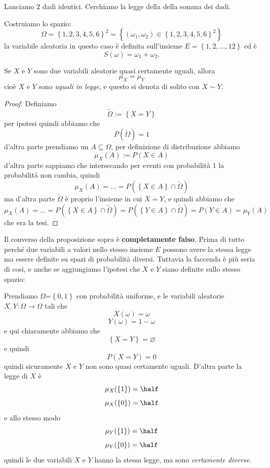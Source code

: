 \documentclass[11pt]{scrartcl}
\newcommand{\eset}{\varnothing}
\begin{document}
	\begin{problem}
		Lanciamo $2$ dadi identici. Cerchiamo la legge della della somma dei dadi.
	\end{problem}
	\begin{answer}
		Costruiamo lo spazio: 
		$$\Omega=\left\{1,2,3,4,5,6\right\}^2=\left\{(\omega_1,\omega_2)\in \left\{1,2,3,4,5,6\right\}^2\right\}$$
		la variabile aleatoria in questo caso è definita sull'insieme $E=\left\{1,2,\dots,12\right\}$ ed è
		$$S(\omega)=\omega_1+\omega_2.$$
	\end{answer}
	\begin{proposition}
		Se $X$ e $Y$ sono due variabili aleatorie quasi certamente uguali, allora 
		$$\mu_X=\mu_Y$$
		cioè $X$ e $Y$ sono \textit{uguali in legge}, e questo si denota di solito con $X\sim Y$.
	\end{proposition}
	\begin{proof}
		Definiamo 
		$$\tilde{\Omega}:=\left\{X=Y\right\}$$
		per ipotesi quindi abbiamo che
		$$P(\tilde{\Omega})=1$$
		d'altra parte prendiamo un $A\subseteq \Omega$, per definizione di distribuzione abbiamo
		$$\mu_X(A):=P\left(X\in A\right)$$
		d'altra parte sappiamo che intersecando per eventi con probabilità $1$ la probabilità non cambia, quindi
		$$\mu_X(A)=\dots = P\left(\left\{X\in A\right\}\cap \tilde{\Omega}\right)$$
		ma d'altra parte $\tilde{\Omega}$ è proprio l'insieme in cui $X=Y$, e quindi abbiamo che 
		$$\mu_X(A)=\dots=P\left(\left\{X\in A\right\}\cap \tilde{\Omega}\right)=P\left(\left\{Y\in A\right\}\cap \tilde{\Omega}\right)=P\left(Y\in A\right)=\mu_Y(A)$$
		che era la tesi.
	\end{proof}
	Il converso della proposizione sopra è \textbf{completamente falso}. Prima di tutto perché due variabili a valori nello stesso insieme $E$ possono avere la stessa legge ma essere definite su spazi di probabilità diversi. Tuttavia la faccenda è più seria di così, e anche se aggiungiamo l'ipotesi che $X$ e $Y$ siano definite sullo stesso spazio:
	\begin{example}
		Prendiamo $\Omega$=$\left\{0,1\right\}$ con probabilità uniforme, e le variabili aleatorie $X,Y:\Omega\to\Omega$  tali che
		$$X(\omega)=\omega$$
		$$Y(\omega)=1-\omega$$
		e qui chiaramente abbiamo che 
		$$\left\{X=Y\right\}=\eset$$
		e quindi
		$$P(X=Y)=0$$
		quindi sicuramente $X$ e $Y$ non sono quasi certamente uguali. D'altra parte la legge di $X$ è
		$$\mu_X(\left\{1\right\})=\half$$ 
		$$\mu_X(\left\{0\right\})=\half$$
		e allo stesso modo
		$$\mu_Y(\left\{1\right\})=\half$$
		$$\mu_Y(\left\{0\right\})=\half$$
		quindi le due variabili $X$ e $Y$ hanno la stessa legge, ma sono \textit{certamente diverse}.
	\end{example}
\end{document}
